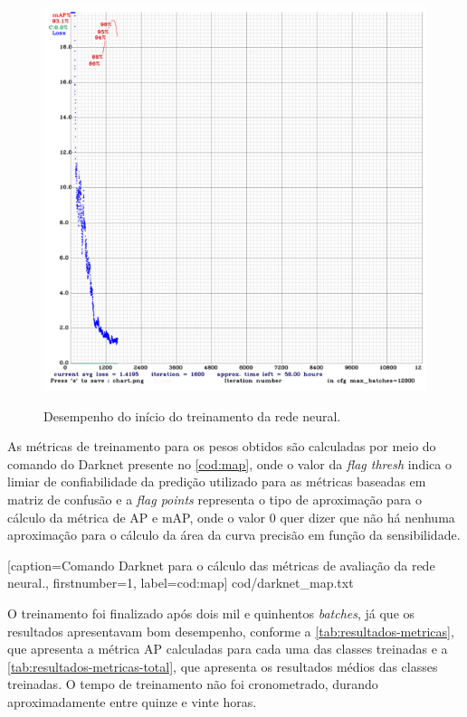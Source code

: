 \begin{figure}[h!] %
  \centering
  \caption{Desempenho do início do treinamento da rede neural.}
  \includegraphics[scale=0.8]{img/img-resultados-grafico.png}
  \label{fig:resultados-grafico}
\end{figure}

As métricas de treinamento para os pesos obtidos são calculadas por meio do comando do Darknet presente no \autoref{cod:map}, onde o valor da \textit{flag thresh} indica o limiar de confiabilidade da predição utilizado para as métricas baseadas em matriz de confusão e a \textit{flag points} representa o tipo de aproximação para o cálculo da métrica de AP e mAP, onde o valor 0 quer dizer que não há nenhuma aproximação para o cálculo da área da curva precisão em função da sensibilidade.


[caption=Comando Darknet para o cálculo das métricas de avaliação da rede neural.,
firstnumber=1,
label=cod:map]
{cod/darknet_map.txt}


O treinamento foi finalizado após dois mil e quinhentos \textit{batches}, já que os resultados  apresentavam bom desempenho, conforme a \autoref{tab:resultados-metricas}, que apresenta a métrica AP calculadas para cada uma das classes treinadas e a \autoref{tab:resultados-metricas-total}, que apresenta os resultados médios das classes treinadas. O tempo de treinamento não foi cronometrado, durando aproximadamente entre quinze e vinte horas.

